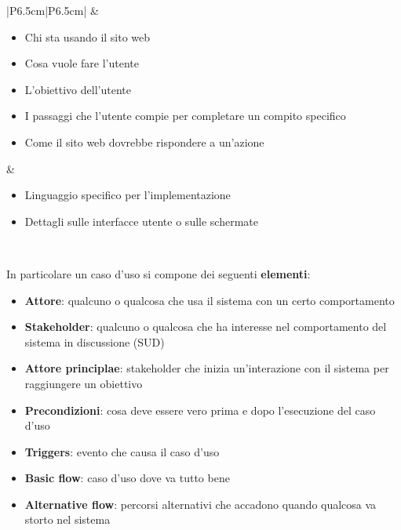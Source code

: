 \begin{table}[h]
	\centering
	\renewcommand{\arraystretch}{1.5}
	\begin{tabular}{|P{6.5cm}|P{6.5cm}|}
		\hline
		 & 
		 \\ \hline
		\begin{itemize}[nosep, leftmargin=*]
			\item Chi sta usando il sito web
			\item Cosa vuole fare l'utente
			\item L'obiettivo dell'utente
			\item I passaggi che l'utente compie per completare un compito specifico
			\item Come il sito web dovrebbe rispondere a un'azione
		\end{itemize} & 
		\begin{itemize}[nosep, leftmargin=*]
			\item Linguaggio specifico per l'implementazione
			\item Dettagli sulle interfacce utente o sulle schermate
		\end{itemize} \\ \hline
	\end{tabular}
\end{table}
\newpage
\noindent In particolare un caso d'uso si compone dei seguenti \textbf{elementi}:
\begin{itemize}
	\item \textbf{Attore}: qualcuno o qualcosa che usa il sistema con un certo comportamento
	\item \textbf{Stakeholder}: qualcuno o qualcosa che ha interesse nel comportamento del sistema in discussione (SUD)
	\item \textbf{Attore principlae}: stakeholder che inizia un'interazione con il sistema per raggiungere un obiettivo
	\item \textbf{Precondizioni}: cosa deve essere vero prima e dopo l'esecuzione del caso d'uso
	\item \textbf{Triggers}: evento che causa il caso d'uso
	\item \textbf{Basic flow}: caso d'uso dove va tutto bene
	\item \textbf{Alternative flow}: percorsi alternativi che accadono quando qualcosa va storto nel sistema
\end{itemize}

